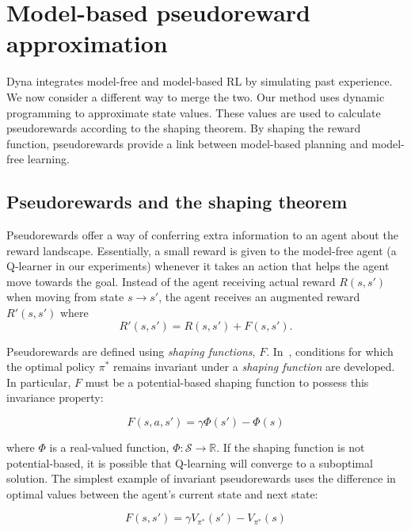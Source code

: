 \documentclass[letterpaper]{article}
\begin{document}
\section{Model-based pseudoreward approximation}

Dyna integrates model-free and model-based RL by simulating past experience. We now consider a different way to merge the two. Our method uses dynamic programming to approximate state values. These values are used to calculate pseudorewards according to the shaping theorem. By shaping the reward function, pseudorewards provide a link between model-based planning and model-free learning.

\subsection{Pseudorewards and the shaping theorem}

Pseudorewards offer a way of conferring extra information to an agent about the reward landscape. Essentially, a small reward is given to the model-free agent (a Q-learner in our experiments) whenever it takes an action that helps the agent move towards the goal. Instead of the agent receiving actual reward $R(s, s')$ when moving from state $s \rightarrow s'$, the agent receives an augmented reward $R'(s, s')$ where
\begin{equation}
R'(s, s') = R(s, s') + F(s, s').
\end{equation} 

Pseudorewards are defined using \textit{shaping functions}, $F$.  In~\cite{ng1999policy}, conditions for which the optimal policy $\pi^*$ remains invariant under a \textit{shaping function} are developed. In particular, $F$ must be a potential-based shaping function to possess this invariance property:

\begin{equation}
F(s, a,s') = \gamma \Phi(s') - \Phi(s) 
\end{equation}

\noindent
where $\Phi$ is a real-valued function, $\Phi : \mathcal{S} \rightarrow \mathbb{R}$. If the shaping function is not potential-based, it is possible that Q-learning will converge to a suboptimal solution. The simplest example of invariant pseudorewards uses the difference in optimal values between the agent's current state and next state:

\begin{equation}
F(s, s') = \gamma V_{\pi^*}(s') - V_{\pi^*}(s) 
\end{equation}
\end{document}
